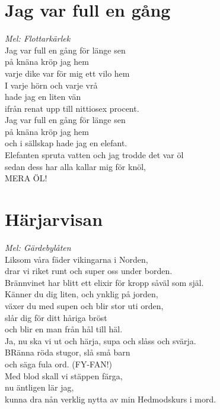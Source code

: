 \documentclass[twoside, openright]{report}
\begin{document}
\section{Jag var full en gång}
\textit{Mel: Flottarkärlek}\\

Jag var full en gång för länge sen\\
på knäna kröp jag hem\\
varje dike var för mig ett vilo hem\\
I varje hörn och varje vrå\\
hade jag en liten vän\\
ifrån renat upp till nittiosex procent.\\

Jag var full en gång för länge sen\\
på knäna kröp jag hem\\
och i sällskap hade jag en elefant.\\
Elefanten spruta vatten och jag trodde det var öl\\
sedan dess har alla kallar mig för knöl,\\
MERA ÖL!\\

\section{Härjarvisan}
\textit{Mel: Gärdebylåten}\\

Liksom våra fäder vikingarna i Norden,\\
drar vi riket runt och super oss under borden.\\
Brännvinet har blitt ett elixir för kropp såväl som själ.\\
Känner du dig liten, och ynklig på jorden,\\
växer du med supen och blir stor uti orden,\\
slår dig för ditt håriga bröst\\
och blir en man från hål till häl.\\

Ja, nu ska vi ut och härja, supa och slåss och svärja.\\
BRänna röda stugor, slå små barn\\
och säga fula ord. (FY-FAN!)\\
Med blod skall vi stäppen färga,\\
nu äntligen lär jag,\\
kunna dra nån verklig nytta av min Hedmodskurs i mord.\\
\end{document}

